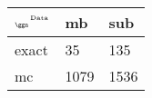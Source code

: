 \begin{tabular}{lll}
    \toprule
    $_{\text{\tiny{\ggn}}}$$^{\text{\tiny{Data}}}$ & mb & sub \\
    \midrule
    exact & 35
              & 135 \\
    mc   & 1079
              & 1536 \\
    \bottomrule
\end{tabular}
